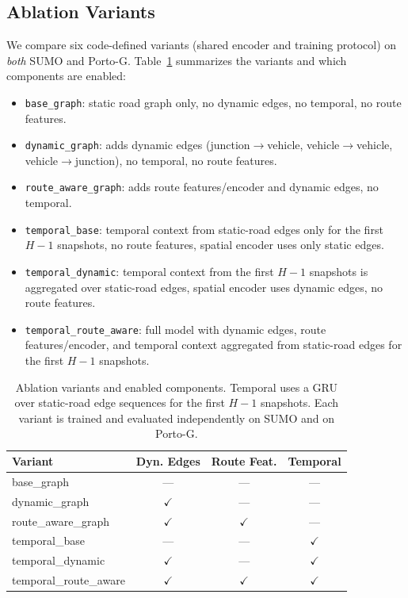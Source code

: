 \subsection{Ablation Variants}\label{sec:ablation-variants}
We compare six code-defined variants (shared encoder and training protocol) on \emph{both} SUMO and Porto-G. Table~\ref{tab:ablation_variants} summarizes the variants and which components are enabled:
\begin{itemize}
    \item \texttt{base\_graph}: static road graph only, no dynamic edges, no temporal, no route features.
    \item \texttt{dynamic\_graph}: adds dynamic edges (junction$\to$vehicle, vehicle$\to$vehicle, vehicle$\to$junction), no temporal, no route features.
    \item \texttt{route\_aware\_graph}: adds route features/encoder and dynamic edges, no temporal.
    \item \texttt{temporal\_base}: temporal context from static-road edges only for the first $H{-}1$ snapshots, no route features, spatial encoder uses only static edges.
    \item \texttt{temporal\_dynamic}: temporal context from the first $H{-}1$ snapshots is aggregated over static-road edges, spatial encoder uses dynamic edges, no route features.
    \item \texttt{temporal\_route\_aware}: full model with dynamic edges, route features/encoder, and temporal context aggregated from static-road edges for the first $H{-}1$ snapshots.
\end{itemize}

\begin{table}[t]
    \centering
    \caption{Ablation variants and enabled components. Temporal uses a GRU over static-road edge sequences for the first $H{-}1$ snapshots. Each variant is trained and evaluated independently on SUMO and on Porto-G.}
    \label{tab:ablation_variants}
    \begin{tabular}{@{}lccc@{}}
        \toprule
        \textbf{Variant} & \textbf{Dyn. Edges} & \textbf{Route Feat.} & \textbf{Temporal} \\
        \midrule
        base\_graph              & --- & --- & --- \\
        dynamic\_graph           & $\checkmark$ & --- & --- \\
        route\_aware\_graph      & $\checkmark$ & $\checkmark$ & --- \\
        temporal\_base           & --- & --- & $\checkmark$ \\
        temporal\_dynamic        & $\checkmark$ & --- & $\checkmark$ \\
        temporal\_route\_aware    & $\checkmark$ & $\checkmark$ & $\checkmark$ \\
        \bottomrule
    \end{tabular}
\end{table}

